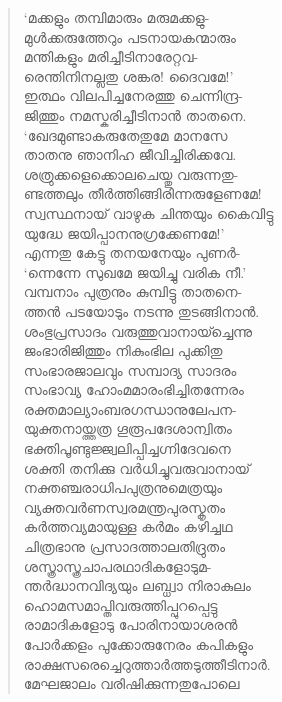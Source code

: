 \begin{verse}
‘മക്കളും തമ്പിമാരും മരുമക്കളു-\\
മുള്‍ക്കരുത്തേറും പടനായകന്മാരും\\
മന്തികളും മരിച്ചീടിനാരേറ്റവ-\\
രെന്തിനിനല്ലതു ശങ്കര! ദൈവമേ!’\\
ഇത്ഥം വിലപിച്ചനേരത്തു ചെന്നിന്ദ്ര-\\
ജിത്തും നമസ്കരിച്ചീടിനാന്‍ താതനെ.\\
‘ഖേദമുണ്ടാകരുതേതുമേ മാനസേ\\
താതനു ഞാനിഹ ജീവിച്ചിരിക്കവേ.\\
ശത്രുക്കളെക്കൊലചെയ്തു വരുന്നതു-\\
ണ്ടത്തലും തീര്‍ത്തിങ്ങിരിന്നരുളേണമേ!\\
സ്വസ്ഥനായ് വാഴുക ചിന്തയും കൈവിട്ടു\\
യുദ്ധേ ജയിപ്പാനനുഗ്രക്കേണമേ!’\\
എന്നതു കേട്ടു തനയനേയും പുണര്‍-\\
‘ന്നെന്നേ സുഖമേ ജയിച്ചു വരിക നീ.’\\
വമ്പനാം പുത്രനും കുമ്പിട്ടു താതനെ-\\
ത്തന്‍ പടയോടും നടന്നു തുടങ്ങിനാന്‍.\\
ശംഭുപ്രസാദം വരുത്തുവാനായ്ച്ചെന്നു\\
ജംഭാരിജിത്തും നികുംഭില പുക്കിതു\\
സംഭാരജാലവും സമ്പാദ്യ സാദരം\\
സംഭാവ്യ ഹോംമമാരംഭിച്ചിതന്നേരം\\
രക്തമാല്യാംബരഗന്ധാനുലേപന-\\
യുക്തനായ്ത്തത്ര ഗൂരൂപദേശാന്വിതം\\
ഭക്തിപൂണ്ടുജ്ജ്വലിപ്പിച്ചഗ്നിദേവനെ\\
ശക്തി തനിക്കു വര്‍ധിച്ചുവരുവാനായ്\\
നക്തഞ്ചരാധിപപുത്രനുമെത്രയും\\
വ്യക്തവര്‍ണസ്വരമന്ത്രപുരസ്കൃതം\\
കര്‍ത്തവ്യമായുള്ള കര്‍മം കഴിച്ചഥ\\
ചിത്രഭാനു പ്രസാദത്താലതിദ്രുതം\\
ശസ്ത്രാസ്ത്രചാപരഥാദികളോടുമ-\\
ന്തര്‍ദ്ധാനവിദ്യയും ലബ്ധ്വാ നിരാകുലം\\
ഹൊമസമാപ്തിവരുത്തിപ്പുറപ്പെട്ടു\\
രാമാദികളോടു പോരിനായാശരന്‍\\
പോര്‍ക്കളം പുക്കോരുനേരം കപികളും\\
രാക്ഷസരെച്ചെറുത്താര്‍ത്തടുത്തീടിനാര്‍.\\
മേഘജാലം വരിഷിക്കുന്നതുപോലെ\\

\end{verse}
